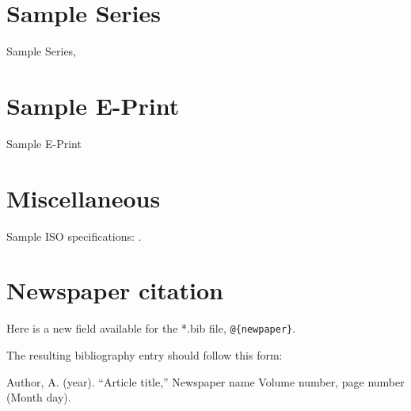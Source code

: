 \documentclass[preprint]{JASA}
\begin{document}
\section*{Sample Series}
Sample Series, 

\citep{sampSeries}

\section*{Sample E-Print}
 Sample E-Print 
\citep{sampEprint}

\section*{Miscellaneous}
Sample ISO specifications: \citep{isoSamp}.

\section*{Newspaper citation}
Here is a new field available for the *.bib file,
\verb+@{newpaper}+.

\cite{newspaperSamp}

The resulting bibliography entry should follow this form:

Author, A. (year). ``Article title,'' Newspaper name Volume number,
page number (Month day).


\end{document}
